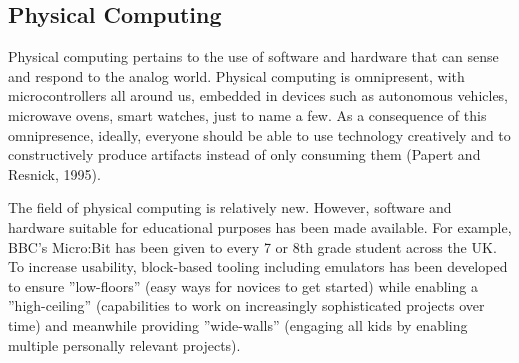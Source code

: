 


\subsection{Physical Computing}


Physical computing pertains to the use of software and hardware that can sense and respond to the analog world. Physical computing is omnipresent, with microcontrollers all around us, embedded in devices such as autonomous vehicles, microwave ovens, smart watches, just to name a few. As a consequence of this omnipresence, ideally, everyone should be able to use technology creatively and to constructively produce artifacts instead of only consuming them (Papert and Resnick, 1995).

The field of physical computing is relatively new. However, software and hardware suitable for educational purposes has been made available. For example, BBC's Micro:Bit has been given to every 7 or 8th grade student across the UK. To increase usability, block-based tooling including emulators has been developed to ensure ''low-floors'' (easy ways for novices to get started) while enabling a ''high-ceiling'' (capabilities to work on increasingly sophisticated projects over time) and meanwhile providing ''wide-walls'' (engaging all kids by enabling multiple personally relevant projects).




